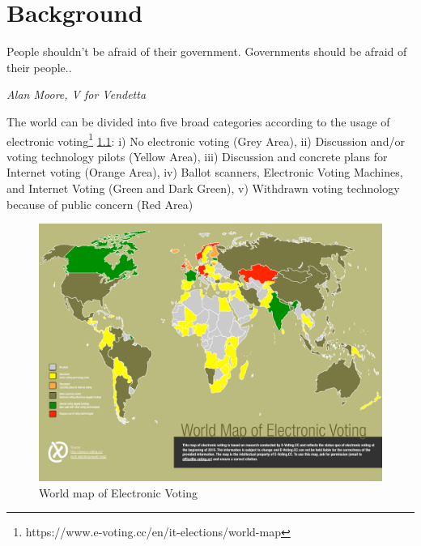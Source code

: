 \chapter{Background}
\label{cha:background}

\epigraph{People shouldn't be afraid of their government. Governments should be afraid of their people..} 
{\textit{Alan Moore, V for Vendetta }}
    The world can be divided into five broad categories according to 
  the usage of electronic voting\footnote{https://www.e-voting.cc/en/it-elections/world-map}
  \ref{fig:world_electronic_voting_map}: i) No electronic voting (Grey Area), ii)
  Discussion and/or voting technology pilots (Yellow Area), 
  iii) Discussion and concrete plans for Internet voting (Orange Area),
  iv) Ballot scanners, Electronic Voting Machines, and Internet Voting (Green and Dark Green),
  v) Withdrawn voting technology because of public concern (Red Area) 
    \begin{figure}[htb]
	\begin{center}
	\includegraphics[scale=0.5]{e-voting_worldmap_2015.pdf}
	\caption{World map of Electronic Voting}
	\label{fig:world_electronic_voting_map}
	\end{center}
  \end{figure}  
 
%  
 

